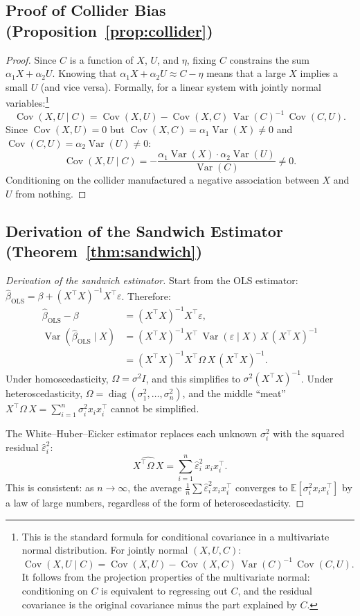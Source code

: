 \documentclass[11pt,a4paper]{article}
\theoremstyle{definition}
\theoremstyle{plain}
\theoremstyle{remark}
\newcommand{\E}{\mathbb{E}}
\newcommand{\Var}{\operatorname{Var}}
\newcommand{\Cov}{\operatorname{Cov}}
\newcommand{\bols}{\hat{\beta}_{\text{OLS}}}
\begin{document}
\subsection{Proof of Collider Bias (Proposition~\ref{prop:collider})}

\begin{proof}
Since $C$ is a function of $X$, $U$, and $\eta$, fixing $C$ constrains the sum $\alpha_1 X + \alpha_2 U$. Knowing that $\alpha_1 X + \alpha_2 U \approx C - \eta$ means that a large $X$ implies a small $U$ (and vice versa). Formally, for a linear system with jointly normal variables:\footnote{This is the standard formula for conditional covariance in a multivariate normal distribution. For jointly normal $(X, U, C)$: $\Cov(X, U \mid C) = \Cov(X, U) - \Cov(X, C)\,\Var(C)^{-1}\,\Cov(C, U)$. It follows from the projection properties of the multivariate normal: conditioning on $C$ is equivalent to regressing out $C$, and the residual covariance is the original covariance minus the part explained by $C$.}
\[
  \Cov(X, U \mid C) = \Cov(X, U) - \Cov(X, C)\,\Var(C)^{-1}\,\Cov(C, U).
\]
Since $\Cov(X, U) = 0$ but $\Cov(X, C) = \alpha_1 \Var(X) \neq 0$ and $\Cov(C, U) = \alpha_2 \Var(U) \neq 0$:
\[
  \Cov(X, U \mid C) = -\frac{\alpha_1 \Var(X) \cdot \alpha_2 \Var(U)}{\Var(C)} \neq 0.
\]
Conditioning on the collider manufactured a negative association between $X$ and $U$ from nothing.
\end{proof}

\subsection{Derivation of the Sandwich Estimator (Theorem~\ref{thm:sandwich})}

\begin{proof}[Derivation of the sandwich estimator]
Start from the OLS estimator: $\bols = \beta + (X^\top X)^{-1} X^\top \varepsilon$. Therefore:
\begin{align*}
  \bols - \beta &= (X^\top X)^{-1} X^\top \varepsilon, \\
  \Var(\bols \mid X) &= (X^\top X)^{-1} X^\top \,\Var(\varepsilon \mid X)\, X\, (X^\top X)^{-1} \\
    &= (X^\top X)^{-1} X^\top \Omega\, X\, (X^\top X)^{-1}.
\end{align*}
Under homoscedasticity, $\Omega = \sigma^2 I$, and this simplifies to $\sigma^2 (X^\top X)^{-1}$. Under heteroscedasticity, $\Omega = \operatorname{diag}(\sigma_1^2, \ldots, \sigma_n^2)$, and the middle ``meat'' $X^\top \Omega\, X = \sum_{i=1}^n \sigma_i^2 x_i x_i^\top$ cannot be simplified.

The White--Huber--Eicker estimator replaces each unknown $\sigma_i^2$ with the squared residual $\hat\varepsilon_i^2$:
\[
  \widehat{X^\top \Omega\, X} = \sum_{i=1}^n \hat\varepsilon_i^2\, x_i x_i^\top.
\]
This is consistent: as $n \to \infty$, the average $\frac{1}{n}\sum \hat\varepsilon_i^2 x_i x_i^\top$ converges to $\E[\sigma_i^2 x_i x_i^\top]$ by a law of large numbers, regardless of the form of heteroscedasticity.
\end{proof}
\end{document}
